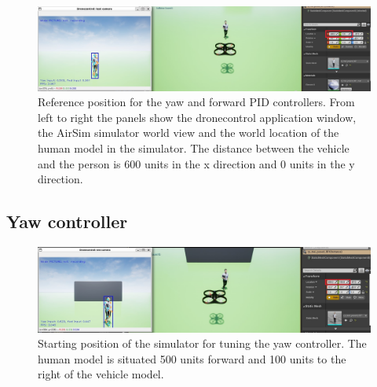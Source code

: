 \begin{figure}
  \centering
  \includegraphics[width=\textwidth, keepaspectratio]{img/pid/tune-ref-pos.jpg}
  \caption{Reference position for the yaw and forward PID controllers. From left to right the panels show the dronecontrol application window, the AirSim simulator world view and the world location of the human model in the simulator. The distance between the vehicle and the person is 600 units in the x direction and 0 units in the y direction.}\label{fig:tune-start-pos}
\end{figure}

\subsection{Yaw controller}


\begin{figure}
  \centering
  \includegraphics[width=\textwidth, keepaspectratio]{img/pid/tune-ref-pos-yaw.jpg}
  \caption{Starting position of the simulator for tuning the yaw controller. The human model is situated 500 units forward and 100 units to the right of the vehicle model.}\label{fig:tune-ref-pos-yaw}
\end{figure}

